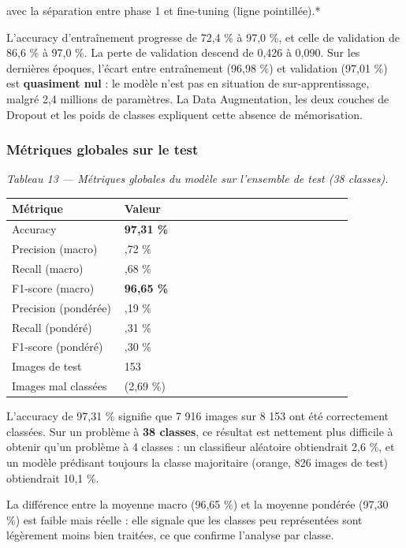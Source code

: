 \documentclass[10pt,a4paper]{article}
\begin{document}
avec la séparation entre phase 1 et fine-tuning (ligne pointillée).*

L'accuracy d'entraînement progresse de 72,4 \% à 97,0 \%, et celle de validation de 86,6 \% à 97,0 \%. La perte de validation descend de 0,426 à 0,090. Sur les dernières époques, l'écart entre entraînement (96,98 \%) et validation (97,01 \%) est \textbf{quasiment nul} : le modèle n'est pas en situation de sur-apprentissage, malgré 2,4 millions de paramètres. La Data Augmentation, les deux couches de Dropout et les poids de classes expliquent cette absence de mémorisation.

\subsubsection{Métriques globales sur le test}

\begin{center}\small\itshape Tableau 13 --- Métriques globales du modèle sur l'ensemble de test (38 classes).\end{center}
{\footnotesize
\begin{longtable}{@{}>{\raggedright\arraybackslash}p{0.28\linewidth}>{\raggedright\arraybackslash}p{0.58\linewidth}@{}}
\toprule
\textbf{Métrique} & \textbf{Valeur} \\
\midrule
\endhead
\bottomrule
\endlastfoot
Accuracy & \textbf{97,31 \%} \\
Precision (macro) & 96,72 \% \\
Recall (macro) & 96,68 \% \\
F1-score (macro) & \textbf{96,65 \%} \\
Precision (pondérée) & 97,19 \% \\
Recall (pondéré) & 97,31 \% \\
F1-score (pondéré) & 97,30 \% \\
Images de test & 8 153 \\
Images mal classées & 240 (2,69 \%) \\
\end{longtable}
}

L'accuracy de 97,31 \% signifie que 7 916 images sur 8 153 ont été correctement classées. Sur un problème à \textbf{38 classes}, ce résultat est nettement plus difficile à obtenir qu'un problème à 4 classes : un classifieur aléatoire obtiendrait 2,6 \%, et un modèle prédisant toujours la classe majoritaire (orange, 826 images de test) obtiendrait 10,1 \%.

La différence entre la moyenne macro (96,65 \%) et la moyenne pondérée (97,30 \%) est faible mais réelle : elle signale que les classes peu représentées sont légèrement moins bien traitées, ce que confirme l'analyse par classe.
\end{document}
